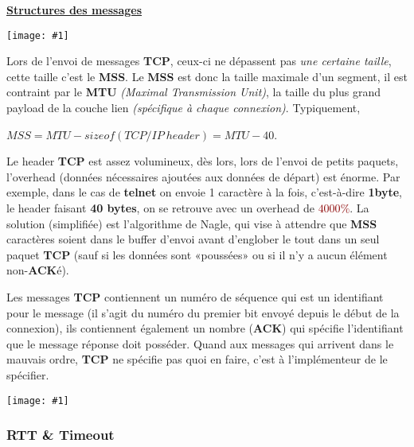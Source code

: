 \documentclass{article}
\newcommand{\dred}[1]{\textcolor{darkred}{\textbf{#1}}}
\newcommand{\imgR}[2]{\begin{center}\texttt{[image: \#1]}\end{center}}
\newcommand{\imgRT}[2]{\begin{center}\texttt{[image: \#1]}\end{center}}
\begin{document}
\underline{\textbf{Structures des messages}}

\imgR{CN_045.png}{300}

Lors de l'envoi de messages \textbf{TCP}, ceux-ci ne dépassent pas \textit{une certaine taille}, cette taille
c'est le \textbf{MSS}. Le \textbf{MSS} est donc la taille maximale d'un segment, il est contraint par le 
\textbf{MTU} \textit{(Maximal Transmission Unit)}, la taille du plus grand payload de la couche lien 
\textit{(spécifique à chaque connexion)}. Typiquement, 
\begin{center}$MSS = MTU-sizeof(TCP/IP\ header) = MTU-40$.\end{center}

Le header \textbf{TCP} est assez volumineux, dès lors, lors de l'envoi de petits paquets, l'overhead (données 
nécessaires ajoutées aux données de départ) est énorme. Par exemple, dans le cas de \textbf{telnet} on envoie
1 caractère à la fois, c'est-à-dire \textbf{1byte}, le header faisant \textbf{40 bytes}, on se retrouve avec un
overhead de \dred{$4000\%$}. La solution (simplifiée) est l'algorithme de Nagle, qui vise à attendre que 
\textbf{MSS} caractères soient dans le buffer d'envoi avant d'englober le tout dans un seul paquet \textbf{TCP} 
(sauf si les données sont «poussées» ou si il n'y a aucun élément non-\textbf{ACK}é).

Les messages \textbf{TCP} contiennent un numéro de séquence qui est un identifiant pour le message (il s'agit du
numéro du premier bit envoyé depuis le début de la connexion), ils contiennent également un nombre 
(\textbf{ACK}) qui spécifie l'identifiant que le message réponse doit posséder.
Quand aux messages qui arrivent dans le mauvais ordre, \textbf{TCP} ne spécifie pas quoi en faire, c'est à 
l'implémenteur de le spécifier.

\imgRT{CN_046.png}{200}

\subsubsection{RTT \& Timeout}
\end{document}
